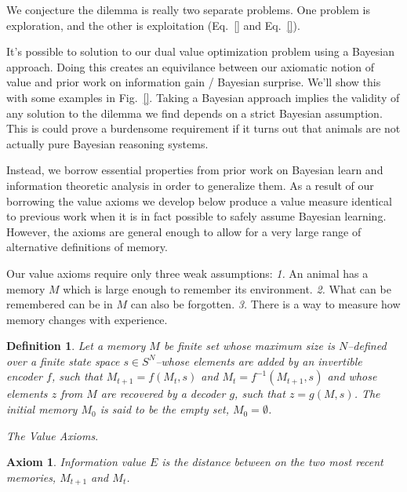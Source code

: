 \documentclass[9pt,twocolumn,twoside]{pnas-new}
\newtheorem{axiom}{Axiom}
\newtheorem{definition}{Definition}
\begin{document}

We conjecture the dilemma is really two separate problems. One problem is exploration, and the other is exploitation (Eq.~\ref{} and Eq.~\ref{}).

It's possible to solution to our dual value optimization problem using a Bayesian approach. Doing this creates an equivilance between our axiomatic notion of value and prior work on information gain / Bayesian surprise. We'll show this with some examples in Fig.~\ref{}. Taking a Bayesian approach implies the validity of any solution to the dilemma we find depends on a strict Bayesian assumption. This is could prove a burdensome requirement if it turns out that animals are not actually pure Bayesian reasoning systems. 

Instead, we borrow essential properties from prior work on Bayesian learn and information theoretic analysis in order to generalize them. As a result of our borrowing the value axioms we develop below produce a value measure identical to previous work when it is in fact possible to safely assume Bayesian learning. However, the axioms are general enough to allow for a very large range of alternative definitions of memory. 

Our value axioms require only three weak assumptions: \textit{1.} An animal has a memory $M$ which is large enough to remember its environment. \textit{2.} What can be remembered can be in $M$ can also be forgotten. \textit{3.} There is a way to measure how memory changes with experience. 

\begin{definition}
    \label{def:memory}
    Let a memory $M$ be finite set whose maximum size is $N$--defined over a finite state space $s \in S^N$--whose elements are added by an invertible encoder $f$, such that $M_{t+1} = f(M_{t}, s)$ and $M_{t} = f^{-1}(M_{t+1}, s)$ and whose elements $z$ from $M$ are recovered by a decoder $g$, such that $z = g(M, s)$. The initial memory $M_{0}$ is said to be the empty set, $M_{0} = \emptyset$.
\end{definition}

\begin{center}{\textit{The Value Axioms}.}\end{center}
\begin{axiom} 
    Information value $E$ is the distance between on the two most recent memories, $M_{t+1}$ and $M_{t}$.
    \label{ax:1}
\end{axiom} 
\end{document}
